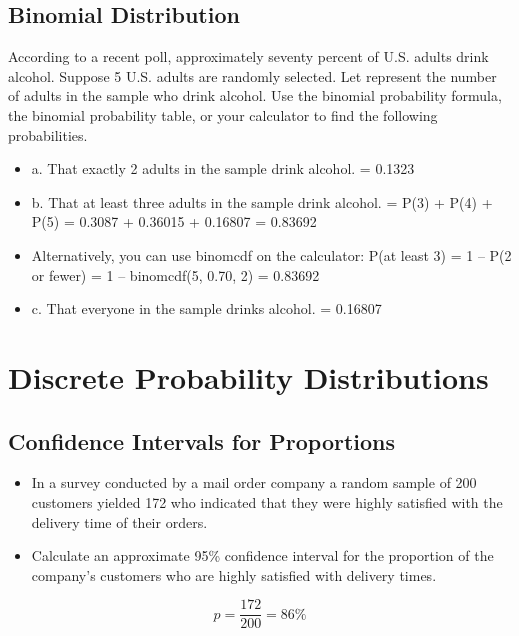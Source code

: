 \documentclass[]{report}
\begin{document}
\subsection{Binomial Distribution}
According to a recent poll, approximately seventy percent of U.S. adults drink alcohol.
Suppose 5 U.S. adults are randomly selected. Let represent the number of adults in the sample who drink 
alcohol. Use the binomial probability formula, the binomial probability table, or your calculator to find the 
following probabilities.
\begin{itemize}
	\item a. That exactly 2 adults in the sample drink alcohol.
	= 0.1323
	\item b. That at least three adults in the sample drink alcohol.
	= P(3) + P(4) + P(5) = 0.3087 + 0.36015 + 0.16807 = 0.83692
	\item Alternatively, you can use binomcdf on the calculator:
	P(at least 3) = 1 – P(2 or fewer) = 1 – binomcdf(5, 0.70, 2) = 0.83692
	\item c. That everyone in the sample drinks alcohol.
	= 0.16807
\end{itemize}




\section{Discrete Probability Distributions}
\subsection{Confidence Intervals for Proportions}

\begin{itemize}
	\item In a survey conducted by a mail order company a random sample of 200 customers yielded 172 who indicated that they 
	were highly satisfied with the delivery time of their orders. 
	
	\item Calculate an approximate 95\% confidence interval for the proportion of the company's customers who are 
	highly satisfied with delivery times.
\end{itemize}


\[p= \frac{172}{200}= 86\%\]
\end{document}
